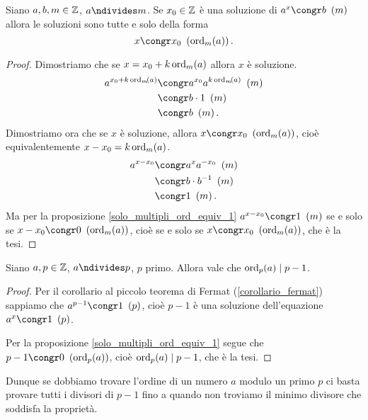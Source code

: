 \begin{proposition}
    Siano $a, b, m \in \Z$, $a \ndivides m$. Se $x_0 \in \Z$ è una soluzione di $a^x \congr b \Mod{m}$ allora le soluzioni sono tutte e solo della forma \begin{equation}
        x \congr x_0 \Mod{\ord{a}{m}}.
    \end{equation}
\end{proposition}
\begin{proof}
    Dimostriamo che se $x = x_0 + k\ord{a}{m}$ allora $x$ è soluzione.
    \begin{alignat*}
        {1}
        a^{x_0 + k\ord{a}{m}} &\congr a^{x_0}a^{k\ord{a}{m}} \Mod{m} \\
        &\congr b \cdot 1 \Mod{m} \\
        &\congr b \Mod{m}.
    \end{alignat*}
    Dimostriamo ora che se $x$ è soluzione, allora $x \congr x_0 \Mod{\ord{a}{m}}$, cioè equivalentemente $x - x_0 = k\ord{a}{m}$.
    \begin{alignat*}
        {1}
        a^{x - x_0} &\congr a^{x}a^{-x_0} \Mod{m} \\
        &\congr b \cdot b^{-1} \Mod{m} \\
        &\congr 1 \Mod{m}.
    \end{alignat*}
    Ma per la proposizione \ref{solo_multipli_ord_equiv_1} $a^{x - x_0} \congr 1 \Mod{m}$ se e solo se $x - x_0 \congr 0 \Mod{\ord{a}{m}}$, cioè se e solo se $x \congr x_0 \Mod{\ord{a}{m}}$, che è la tesi.
\end{proof}

\begin{proposition}
    Siano $a, p \in \Z$, $a \ndivides p$, $p$ primo. Allora vale che $\ord{a}{p} \divides p-1$.
\end{proposition}
\begin{proof}
    Per il corollario al piccolo teorema di Fermat (\ref{corollario_fermat}) sappiamo che $a^{p-1} \congr 1 \Mod{p}$, cioè $p-1$ è una soluzione dell'equazione $a^x \congr 1 \Mod{p}$. 
    
    Per la proposizione \ref{solo_multipli_ord_equiv_1} segue che $p-1 \congr 0 \Mod{\ord{a}{p}}$, cioè $\ord{a}{p} \divides p-1$, che è la tesi.
\end{proof}

Dunque se dobbiamo trovare l'ordine di un numero $a$ modulo un primo $p$ ci basta provare tutti i divisori di $p - 1$ fino a quando non troviamo il minimo divisore che soddisfa la proprietà.

